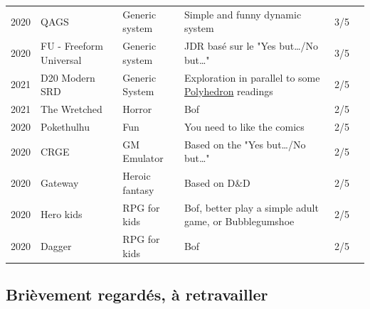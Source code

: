 \documentclass[a4paper, 11pt, twoside]{article}
\begin{document}
\begin{longtable}{cp{2cm}p{1.5cm}p{7cm}cc}
2020 & QAGS & Generic system & Simple and funny dynamic system & 3/5\\
2020 & FU - Freeform Universal & Generic system & JDR basé sur le "Yes but\ldots{}/No but\ldots{}" & 3/5\\
2021 & D20 Modern SRD & Generic System & Exploration in parallel to some \href{https://archive.org/details/Polyhedron105}{Polyhedron} readings & 2/5\\
2021 & The Wretched & Horror & Bof & 2/5\\
2020 & Pokethulhu & Fun & You need to like the comics & 2/5\\
2020 & CRGE & GM Emulator & Based on the "Yes but\ldots{}/No but\ldots{}" & 2/5\\
2020 & Gateway & Heroic fantasy & Based on D\&D & 2/5\\
2020 & Hero kids & RPG for kids & Bof, better play a simple adult game, or Bubblegumshoe & 2/5\\
2020 & Dagger & RPG for kids & Bof & 2/5\\
\end{longtable}

\subsection{Brièvement regardés, à retravailler}
\label{sec:org90142a5}
\end{document}
